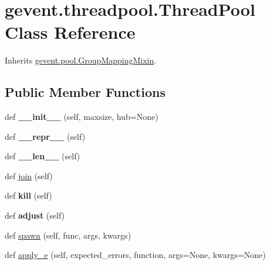 \hypertarget{classgevent_1_1threadpool_1_1_thread_pool}{}\section{gevent.\+threadpool.\+Thread\+Pool Class Reference}
\label{classgevent_1_1threadpool_1_1_thread_pool}


Inherits \hyperlink{classgevent_1_1pool_1_1_group_mapping_mixin}{gevent.\+pool.\+Group\+Mapping\+Mixin}.

\subsection*{Public Member Functions}
\begin{DoxyCompactItemize}
\item 
\mbox{\label{classgevent_1_1threadpool_1_1_thread_pool_ac74babd5e3d1b131c2681fee13f18172}} 
def {\bfseries \+\_\+\+\_\+init\+\_\+\+\_\+} (self, maxsize, hub=None)
\item 
\mbox{\label{classgevent_1_1threadpool_1_1_thread_pool_a2f149bc2f41b4a6ffd19b074cc771eed}} 
def {\bfseries \+\_\+\+\_\+repr\+\_\+\+\_\+} (self)
\item 
\mbox{\label{classgevent_1_1threadpool_1_1_thread_pool_a34b8f14d7c22f4af7c11d719bf4693a0}} 
def {\bfseries \+\_\+\+\_\+len\+\_\+\+\_\+} (self)
\item 
def \hyperlink{classgevent_1_1threadpool_1_1_thread_pool_a41714dec077e4743eb1ecc8c3480907a}{join} (self)
\item 
\mbox{\label{classgevent_1_1threadpool_1_1_thread_pool_ae31967a9562643996593cd6486ff9b98}} 
def {\bfseries kill} (self)
\item 
\mbox{\label{classgevent_1_1threadpool_1_1_thread_pool_a279b55ef415b64c2f2264347f0c292ac}} 
def {\bfseries adjust} (self)
\item 
def \hyperlink{classgevent_1_1threadpool_1_1_thread_pool_a26f9ca9ff98d972996db01c82a58848a}{spawn} (self, func, args, kwargs)
\item 
def \hyperlink{classgevent_1_1threadpool_1_1_thread_pool_a45cd7c1a5881b6c153e573e71f4d5f45}{apply\+\_\+e} (self, expected\+\_\+errors, function, args=None, kwargs=None)
\end{DoxyCompactItemize}
